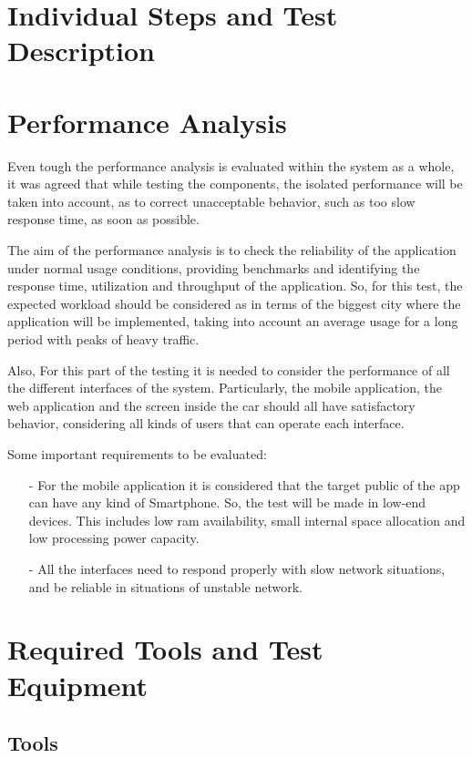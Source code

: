 \documentclass[a4paper]{article}
\begin{document}
\newpage
\section{Individual Steps and Test Description}
\newpage

\section{Performance Analysis}

Even tough the performance analysis is evaluated within the system as a whole, it was agreed that while testing the components, the isolated performance will be taken into account, as to correct unacceptable behavior, such as too slow response time, as soon as possible. 

The aim of the performance analysis is to check the reliability of the application under normal usage conditions, providing benchmarks and identifying the response time, utilization and throughput of the application. So, for this test, the expected workload should be considered as in terms of the biggest city where the application will be implemented, taking into account an average usage for a long period with peaks of heavy traffic. 

Also, For this part of the testing it is needed to consider the performance of all the different interfaces of the system. Particularly, the mobile application, the web application and the screen inside the car should all have satisfactory behavior, considering all kinds of users that can operate each interface. 

Some important requirements to be evaluated:
\begin{itemize}
\item[-] For the mobile application it is considered that the target public of the app can have any kind of Smartphone. So, the test will be made in low-end devices. This includes low ram availability, small internal space allocation and low processing power capacity.
\item[-] All the interfaces need to respond properly with slow network situations, and be reliable in situations of unstable network. 
\end{itemize}
\newpage


\section{Required Tools and Test Equipment}
\subsection{Tools}
\end{document}
